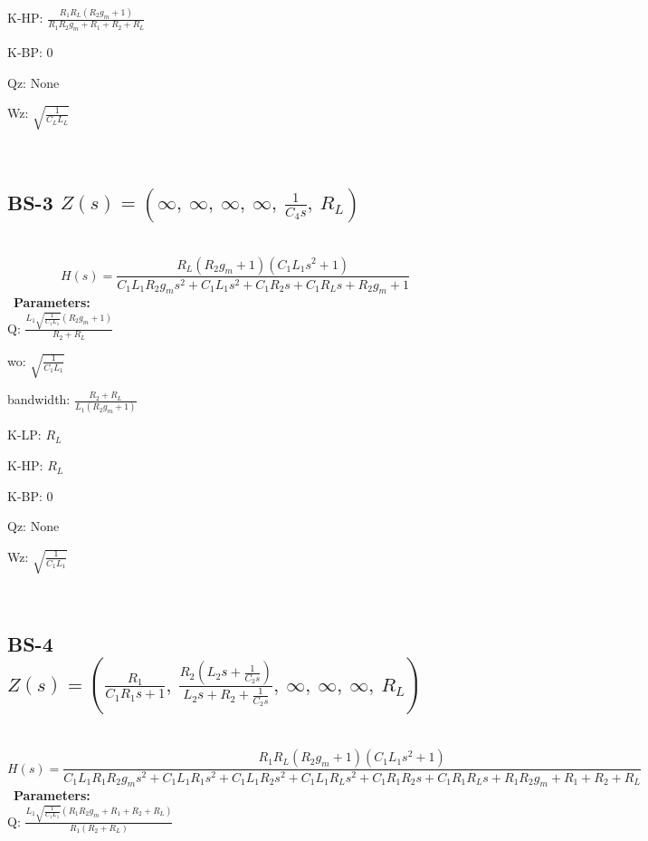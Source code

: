 \documentclass{article}
\begin{document}
K-HP: $\frac{R_{1} R_{L} \left(R_{2} g_{m} + 1\right)}{R_{1} R_{2} g_{m} + R_{1} + R_{2} + R_{L}}$\ 

K-BP: $0$\ 

Qz: $\text{None}$\ 

Wz: $\sqrt{\frac{1}{C_{L} L_{L}}}$\ 

\ 

\subsection{BS-3 $Z(s) = \left( \infty, \  \infty, \  \infty, \  \infty, \  \frac{1}{C_{4} s}, \  R_{L}\right)$ } \ 
\textbf{\[H(s) = \frac{R_{L} \left(R_{2} g_{m} + 1\right) \left(C_{1} L_{1} s^{2} + 1\right)}{C_{1} L_{1} R_{2} g_{m} s^{2} + C_{1} L_{1} s^{2} + C_{1} R_{2} s + C_{1} R_{L} s + R_{2} g_{m} + 1}\] } \ 
\textbf{Parameters:}\\ 

Q: $\frac{L_{1} \sqrt{\frac{1}{C_{1} L_{1}}} \left(R_{2} g_{m} + 1\right)}{R_{2} + R_{L}}$\ 

wo: $\sqrt{\frac{1}{C_{1} L_{1}}}$\ 

bandwidth: $\frac{R_{2} + R_{L}}{L_{1} \left(R_{2} g_{m} + 1\right)}$\ 

K-LP: $R_{L}$\ 

K-HP: $R_{L}$\ 

K-BP: $0$\ 

Qz: $\text{None}$\ 

Wz: $\sqrt{\frac{1}{C_{1} L_{1}}}$\ 

\ 

\subsection{BS-4 $Z(s) = \left( \frac{R_{1}}{C_{1} R_{1} s + 1}, \  \frac{R_{2} \left(L_{2} s + \frac{1}{C_{2} s}\right)}{L_{2} s + R_{2} + \frac{1}{C_{2} s}}, \  \infty, \  \infty, \  \infty, \  R_{L}\right)$ } \ 
\textbf{\[H(s) = \frac{R_{1} R_{L} \left(R_{2} g_{m} + 1\right) \left(C_{1} L_{1} s^{2} + 1\right)}{C_{1} L_{1} R_{1} R_{2} g_{m} s^{2} + C_{1} L_{1} R_{1} s^{2} + C_{1} L_{1} R_{2} s^{2} + C_{1} L_{1} R_{L} s^{2} + C_{1} R_{1} R_{2} s + C_{1} R_{1} R_{L} s + R_{1} R_{2} g_{m} + R_{1} + R_{2} + R_{L}}\] } \ 
\textbf{Parameters:}\\ 

Q: $\frac{L_{1} \sqrt{\frac{1}{C_{1} L_{1}}} \left(R_{1} R_{2} g_{m} + R_{1} + R_{2} + R_{L}\right)}{R_{1} \left(R_{2} + R_{L}\right)}$\ 
\end{document}
